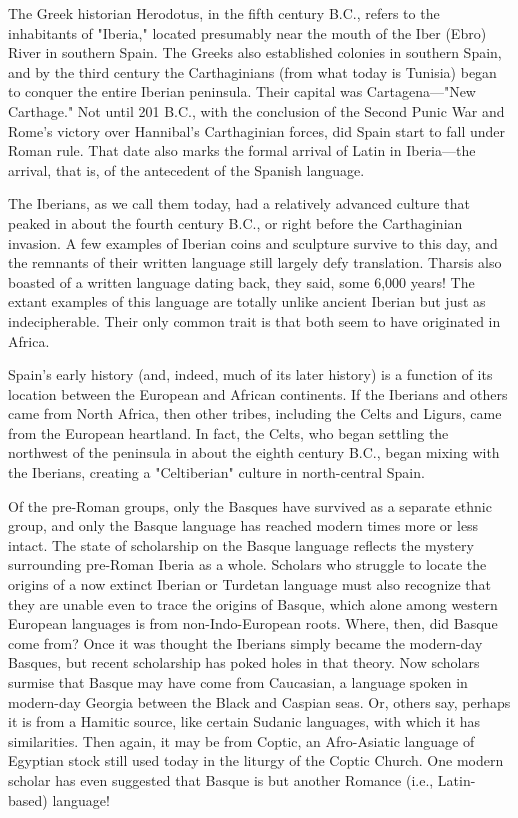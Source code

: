 The Greek historian Herodotus, in the fifth century B.C., refers
to the inhabitants of "Iberia," located presumably near the mouth of
the Iber (Ebro) River in southern Spain. The Greeks also established
colonies in southern Spain, and by the third century the Carthaginians (from what today is Tunisia) began to conquer the entire Iberian
peninsula. Their capital was Cartagena---"New Carthage." Not until
201 B.C., with the conclusion of the Second Punic War and Rome's victory over Hannibal's Carthaginian forces, did Spain start to fall under
Roman rule. That date also marks the formal arrival of Latin in Iberia---the arrival, that is, of the antecedent of the Spanish language.

The Iberians, as we call them today, had a relatively advanced
culture that peaked in about the fourth century B.C., or right before
the Carthaginian invasion. A few examples of Iberian coins and sculpture survive to this day, and the remnants of their written language
still largely defy translation. Tharsis also boasted of a written language dating back, they said, some 6,000 years! The extant examples
of this language are totally unlike ancient Iberian but just as indecipherable. Their only common trait is that both seem to have originated in Africa.

Spain's early history (and, indeed, much of its later history) is a
function of its location between the European and African continents.
If the Iberians and others came from North Africa, then other tribes,
including the Celts and Ligurs, came from the European heartland. In
fact, the Celts, who began settling the northwest of the peninsula in
about the eighth century B.C., began mixing with the Iberians, creating
a "Celtiberian" culture in north-central Spain.

Of the pre-Roman groups, only the Basques have survived
as a separate ethnic group, and only the Basque language has reached
modern times more or less intact. The state of scholarship on the
Basque language reflects the mystery surrounding pre-Roman Iberia
as a whole. Scholars who struggle to locate the origins of a now extinct
Iberian or Turdetan language must also recognize that they are unable
even to trace the origins of Basque, which alone among
western European languages is from non-Indo-European roots. Where, then, did
Basque come from? Once it was thought the Iberians simply became
the modern-day Basques, but recent scholarship has poked holes in
that theory. Now scholars surmise that Basque may have come from
Caucasian, a language spoken in modern-day Georgia between the
Black and Caspian seas. Or, others say, perhaps it is from a Hamitic
source, like certain Sudanic languages, with which it has similarities.
Then again, it may be from Coptic, an Afro-Asiatic language of Egyptian stock still used today in the liturgy of the Coptic Church. One
modern scholar has even suggested that Basque is but another Romance (i.e., Latin-based) language!

